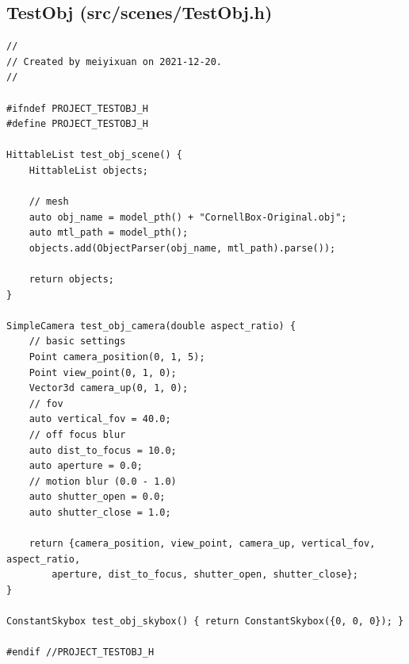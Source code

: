 \documentclass[utf8]{article}
\begin{document}
\subsection{TestObj (src/scenes/TestObj.h)}
\begin{lstlisting}[style=CStyle]
//
// Created by meiyixuan on 2021-12-20.
//

#ifndef PROJECT_TESTOBJ_H
#define PROJECT_TESTOBJ_H

HittableList test_obj_scene() {
	HittableList objects;
	
	// mesh
	auto obj_name = model_pth() + "CornellBox-Original.obj";
	auto mtl_path = model_pth();
	objects.add(ObjectParser(obj_name, mtl_path).parse());
	
	return objects;
}

SimpleCamera test_obj_camera(double aspect_ratio) {
	// basic settings
	Point camera_position(0, 1, 5);
	Point view_point(0, 1, 0);
	Vector3d camera_up(0, 1, 0);
	// fov
	auto vertical_fov = 40.0;
	// off focus blur
	auto dist_to_focus = 10.0;
	auto aperture = 0.0;
	// motion blur (0.0 - 1.0)
	auto shutter_open = 0.0;
	auto shutter_close = 1.0;
	
	return {camera_position, view_point, camera_up, vertical_fov, aspect_ratio,
		aperture, dist_to_focus, shutter_open, shutter_close};
}

ConstantSkybox test_obj_skybox() { return ConstantSkybox({0, 0, 0}); }

#endif //PROJECT_TESTOBJ_H

\end{lstlisting}
\end{document}
